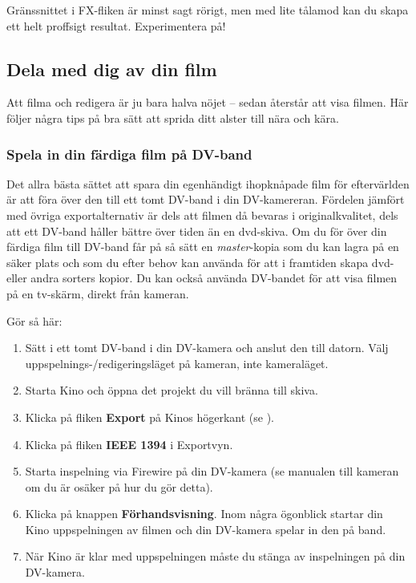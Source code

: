 \documentclass[a4paper,final]{memoir} %
\begin{document}
Gränssnittet i FX-fliken är minst sagt rörigt, men med lite tålamod kan du skapa ett helt proffsigt resultat. Experimentera på!


\subsection{Dela med dig av din film}

Att filma och redigera är ju bara halva nöjet -- sedan återstår att visa filmen. Här följer några tips på bra sätt att sprida ditt alster till nära och kära.

\subsubsection{Spela in din färdiga film på DV-band}


Det allra bästa sättet att spara din egenhändigt ihopknåpade film för eftervärlden är att föra över den till ett tomt DV-band i din DV-kamereran. Fördelen jämfört med övriga exportalternativ är dels att filmen då bevaras i originalkvalitet, dels att ett DV-band håller bättre över tiden än en dvd-skiva. Om du för över din färdiga film till DV-band får på så sätt en \textit{master}-kopia som du kan lagra på en säker plats och som du efter behov kan använda för att i framtiden skapa dvd- eller andra sorters kopior. Du kan också använda DV-bandet för att visa filmen på en tv-skärm, direkt från kameran.

Gör så här:

\begin{enumerate}

\item Sätt i ett tomt DV-band i din DV-kamera och anslut den till datorn. Välj uppspelnings-/redigeringsläget på kameran, inte kameraläget.

\item Starta Kino och öppna det projekt du vill bränna till skiva. 

\item Klicka på fliken \textbf{Export} på Kinos högerkant (se ).	

\item Klicka på fliken \textbf{IEEE 1394} i Exportvyn.

\item Starta inspelning via Firewire på din DV-kamera (se  manualen till kameran om du är osäker på hur du gör detta).

\item Klicka på knappen \textbf{Förhandsvisning}. Inom några ögonblick startar din Kino uppspelningen av filmen och din DV-kamera spelar in den på band.

\item När Kino är klar med uppspelningen måste du stänga av inspelningen på din DV-kamera.

\end{enumerate}
\end{document}
